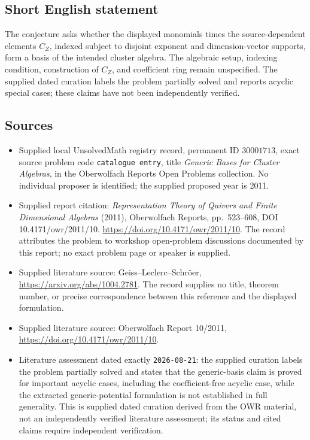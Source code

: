 \documentclass[11pt]{article}
\begin{document}
\subsection{Short English statement}
The conjecture asks whether the displayed monomials times the source-dependent elements \(C_Z\), indexed subject to disjoint exponent and dimension-vector supports, form a basis of the intended cluster algebra. The algebraic setup, indexing condition, construction of \(C_Z\), and coefficient ring remain unspecified. The supplied dated curation labels the problem partially solved and reports acyclic special cases; these claims have not been independently verified.
\subsection{Sources}
\begin{itemize}
\item Supplied local UnsolvedMath registry record, permanent ID \(30001713\), exact source problem code \texttt{catalogue entry}, title \emph{Generic Bases for Cluster Algebras}, in the Oberwolfach Reports Open Problems collection. No individual proposer is identified; the supplied proposed year is 2011.
\item Supplied report citation: \emph{Representation Theory of Quivers and Finite Dimensional Algebras} (2011), Oberwolfach Reports, pp.~523--608, DOI 10.4171/owr/2011/10. \url{https://doi.org/10.4171/owr/2011/10}. The record attributes the problem to workshop open-problem discussions documented by this report; no exact problem page or speaker is supplied.
\item Supplied literature source: Geiss--Leclerc--Schr\"oer, \url{https://arxiv.org/abs/1004.2781}. The record supplies no title, theorem number, or precise correspondence between this reference and the displayed formulation.
\item Supplied literature source: Oberwolfach Report 10/2011, \url{https://doi.org/10.4171/owr/2011/10}.
\item Literature assessment dated exactly \texttt{2026-08-21}: the supplied curation labels the problem partially solved and states that the generic-basis claim is proved for important acyclic cases, including the coefficient-free acyclic case, while the extracted generic-potential formulation is not established in full generality. This is supplied dated curation derived from the OWR material, not an independently verified literature assessment; its status and cited claims require independent verification.
\end{itemize}
\end{document}
